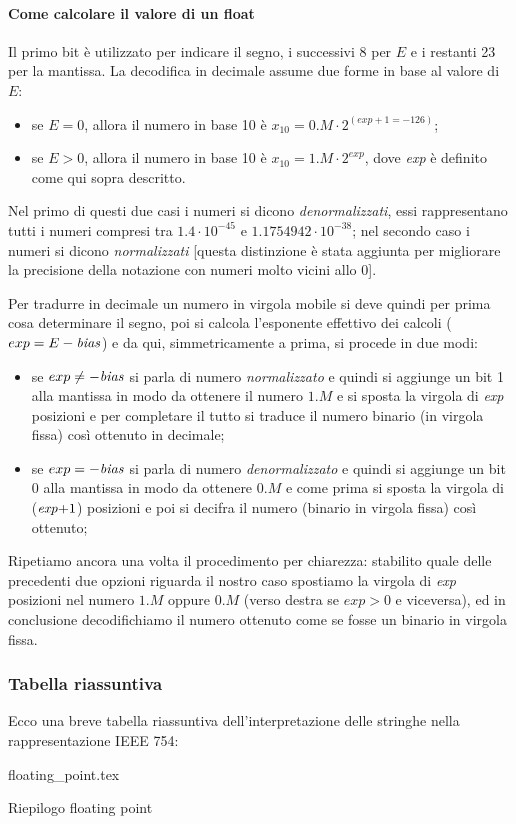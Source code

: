 \documentclass[class=book, crop=false, oneside]{standalone}
\begin{document}
\paragraph{Come calcolare il valore di un float} Il primo bit è utilizzato per indicare il segno, i successivi 8 per $E$ e i restanti 23 per la mantissa. La decodifica in decimale assume due forme in base al valore di \(E\):
\begin{itemize}
	\item se \(E=0\), allora il numero in base 10 è \(x_{10}=0.M \cdot 2^{(exp+1=-126)}\);
	\item se \(E>0\), allora il numero in base 10 è \(x_{10}=1.M \cdot 2^{exp}\), dove \emph{exp} è definito come qui sopra descritto.
\end{itemize}
Nel primo di questi due casi i numeri si dicono \emph{denormalizzati}, essi rappresentano tutti i numeri compresi tra \(1.4\cdot10^{-45}\) e \(1.1754942\cdot10^{-38}\); nel secondo caso i numeri si dicono \emph{normalizzati} [questa distinzione è stata aggiunta per migliorare la precisione della notazione con numeri molto vicini allo 0].

Per tradurre in decimale un numero in virgola mobile si deve quindi per prima cosa determinare il segno, poi si calcola l'esponente effettivo dei calcoli (\(exp=E-\text{\emph{bias}}\)) e da qui, simmetricamente a prima, si procede in due modi:
\begin{itemize}
	\item se \(exp\neq-\text{\emph{bias}}\) si parla di numero \emph{normalizzato} e quindi si aggiunge un bit 1 alla mantissa in modo da ottenere il numero \(1.M\) e si sposta la virgola di \emph{exp} posizioni e per completare il tutto si traduce il numero binario (in virgola fissa) così ottenuto in decimale;
	\item se \(exp=-\text{\emph{bias}}\) si parla di numero \emph{denormalizzato} e quindi si aggiunge un bit 0 alla mantissa in modo da ottenere $0.M$ e come prima si sposta la virgola di (\(\text{\emph{exp}+1}\)) posizioni e poi si decifra il numero (binario in virgola fissa) così ottenuto;
\end{itemize}
Ripetiamo ancora una volta il procedimento per chiarezza: stabilito quale delle precedenti due opzioni riguarda il nostro caso spostiamo la virgola di \emph{exp} posizioni nel numero \(1.M\) oppure \(0.M\) (verso destra se \(exp>0\) e viceversa), ed in conclusione decodifichiamo il numero ottenuto come se fosse un binario in virgola fissa.

\subsubsection{Tabella riassuntiva}
Ecco una breve tabella riassuntiva dell'interpretazione delle stringhe nella rappresentazione IEEE 754:
\begin{table}[h!]
	\centering
	{floating_point.tex}
	\caption{Riepilogo floating point}
\end{table}
\end{document}
